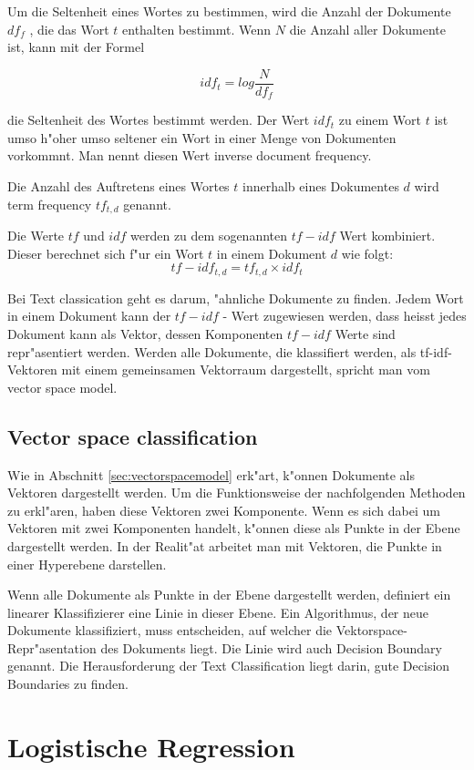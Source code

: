 \documentclass[12pt,a4paper,twoside]{article}
\begin{document}
Um die Seltenheit eines Wortes zu bestimmen, wird die Anzahl der Dokumente $df_f$ , die das Wort $t$ enthalten bestimmt. Wenn $N$ die Anzahl aller Dokumente ist, kann mit der Formel

\[
idf_t = log \frac{ N}{df_f}
\]

die Seltenheit des Wortes bestimmt werden. Der Wert $idf_t$ zu einem Wort $t$ ist umso h"oher umso seltener ein Wort in einer Menge von Dokumenten vorkommnt. Man nennt diesen Wert inverse document frequency\cite{manning08}.

Die Anzahl des Auftretens eines Wortes $t$ innerhalb eines Dokumentes $d$ wird term frequency $tf_{t,d}$ genannt.

Die Werte $tf$ und $idf$ werden zu dem sogenannten $tf-idf$ Wert kombiniert. Dieser berechnet sich f"ur ein Wort $t$ in einem Dokument $d$ wie folgt:
\[
tf-idf_{t,d} = tf_{t,d} \times idf_t
\]

Bei Text classication geht es darum, "ahnliche Dokumente zu finden. Jedem Wort in einem Dokument kann der $tf-idf$ - Wert zugewiesen werden, dass heisst jedes Dokument kann als Vektor, dessen Komponenten $tf-idf$ Werte sind repr"asentiert werden. Werden alle Dokumente, die klassifiert werden, als tf-idf-Vektoren mit einem gemeinsamen Vektorraum dargestellt, spricht man vom vector space model.

\subsection{Vector space classification}
\label{sec:vectorclassification}

Wie in Abschnitt \ref{sec:vectorspacemodel} erk"art, k"onnen Dokumente als Vektoren dargestellt werden. Um die Funktionsweise der nachfolgenden Methoden zu erkl"aren, haben diese Vektoren zwei Komponente. Wenn es sich dabei um Vektoren mit zwei Komponenten handelt, k"onnen diese als Punkte in der Ebene dargestellt werden. In der Realit"at arbeitet man mit Vektoren, die Punkte in einer Hyperebene darstellen.

Wenn alle Dokumente als Punkte in der Ebene dargestellt werden, de\-finiert ein linearer Klassifizierer eine Linie in dieser Ebene. Ein Algorithmus, der neue Dokumente klassifiziert, muss entscheiden, auf welcher die Vektorspace-Repr"a\-sentation des Dokuments liegt. Die Linie wird auch Decision Boundary genannt. Die Herausforderung der Text Classification liegt darin, gute Decision Boundaries zu finden.

\section{Logistische Regression}
\label{sec:logisticreg}
\end{document}
